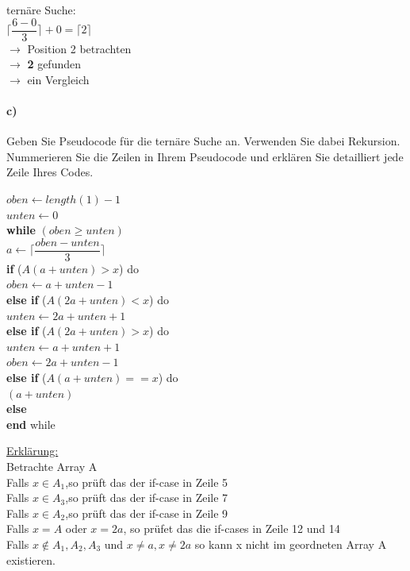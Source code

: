 \documentclass[paper=a4, fontsize=11pt]{scrartcl}
\numberwithin{equation}{section}
\numberwithin{figure}{section}
\numberwithin{table}{section}
\begin{document}
ternäre Suche: \\
$\lceil \dfrac{6-0}{3} \rceil + 0 = \lceil 2 \rceil$ \\
$\rightarrow$ Position 2 betrachten \\
$\rightarrow$ \textbf{2} gefunden \\
$\rightarrow$ ein Vergleich \\

\paragraph{c)} 
Geben Sie Pseudocode für die ternäre Suche an. Verwenden Sie dabei Rekursion. Nummerieren Sie die Zeilen in Ihrem Pseudocode und erklären Sie detailliert jede Zeile Ihres Codes. \\

\begin{algorithm}[H]
\SetAlgoLined
{}
$oben \leftarrow length(1)-1$\\
$unten \leftarrow 0$\\
\textbf{while} $(oben \geq unten)$ \\
$a \leftarrow \lceil \dfrac{oben-unten}{3} \rceil$ \\
\textbf{if} ($A(a+ unten) > x$) do \\
$oben \leftarrow a+unten-1$ \\
\textbf{else if} ($A(2a+unten) < x $) do\\
$unten \leftarrow 2a+unten+1$ \\
\textbf{else if} ($A(2a+unten) > x $) do\\
$unten \leftarrow a+unten+1$ \\
$oben \leftarrow 2a+unten-1$ \\
\textbf{else if} ($A(a+unten) == x $) do\\
\Return $(a+unten)$ \\
\textbf{else}  \\
\textbf{end} while
\end{algorithm}


\underline{Erklärung:} \\
Betrachte Array A \\
Falls $x \in A_{1}$,so prüft das der if-case in Zeile 5 \\
Falls $x \in A_{3}$,so prüft das der if-case in Zeile 7 \\
Falls $x \in A_{2}$,so prüft das der if-case in Zeile 9 \\
Falls $x=A$ oder $x=2a$, so prüfet das die if-cases in Zeile 12 und 14 \\
Falls $x \notin A_{1},A_{2},A_{3}$ und $x \neq a, x \neq 2a$ so kann x nicht im geordneten Array A existieren.
\end{document}
